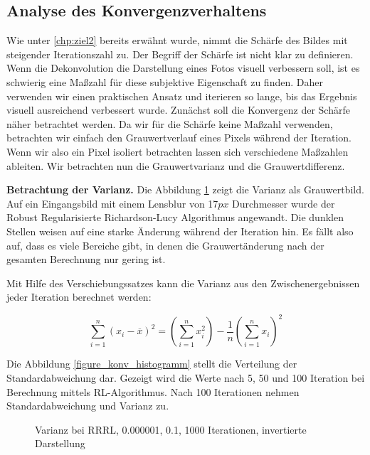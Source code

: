 \documentclass[a4paper,12pt]{article}
\begin{document}
\subsection{Analyse des Konvergenzverhaltens}\label{chp:methodik_konvergenz} 
Wie unter \ref{chp:ziel2} bereits erwähnt wurde, nimmt die Schärfe des Bildes
mit steigender Iterations\-zahl zu. Der Begriff der Schärfe ist nicht klar zu
definieren. Wenn die Dekonvolution die Darstellung eines Fotos visuell
verbessern soll, ist es schwierig eine Maßzahl für diese subjektive Eigenschaft
zu finden. Daher verwenden wir einen praktischen Ansatz und iterieren so lange,
bis das Ergebnis visuell ausreichend verbessert wurde. Zunächst soll die Konvergenz
der Schärfe näher betrachtet werden. Da wir für die Schärfe keine Maßzahl
verwenden, betrachten wir einfach den Grauwertverlauf eines Pixels während der
Iteration. Wenn wir also ein Pixel isoliert betrachten lassen sich verschiedene
Maßzahlen ableiten. Wir betrachten nun die Grauwertvarianz und die
Grauwertdifferenz.


\textbf{Betrachtung der Varianz.} 
Die Abbildung \ref{figure_konver_altes_bild}
zeigt die Varianz als Grauwertbild. Auf ein Eingangsbild mit einem Lensblur von
17$px$ Durchmesser wurde der Robust Regularisierte Richardson-Lucy Algorithmus
angewandt. Die dunklen Stellen weisen auf eine starke Änderung während der
Iteration hin. Es fällt also auf, dass es viele Bereiche gibt, in denen die
Grauwertänderung nach der gesamten Berechnung nur gering ist. 

Mit Hilfe des Verschiebungssatzes kann die Varianz aus den Zwischenergebnissen
jeder Iteration berechnet werden:
 
\begin{equation} \label{eq:verschiebungssatz}
\sum_{i=1}^{n} (x_i - \overline{x})^2 = \left(  \sum_{i=1}^{n} x_i^2 \right ) -
\frac{1}{n} \left ( \sum_{i=1}^{n} x_i \right ) ^2
\end{equation}

Die Abbildung \ref{figure_konv_histogramm} stellt die Verteilung der
Standardabweichung dar.
Gezeigt wird die Werte nach 5, 50 und 100 Iteration bei Berechnung mittels
RL-Algorithmus. Nach 100 Iterationen nehmen Standardabweichung und Varianz zu.


\begin{figure}[htbp]
\caption{Varianz bei RRRL, 0.000001, 0.1, 1000 Iterationen, invertierte
Darstellung}%
\label{figure_konver_altes_bild}
\end{figure}
\end{document}
